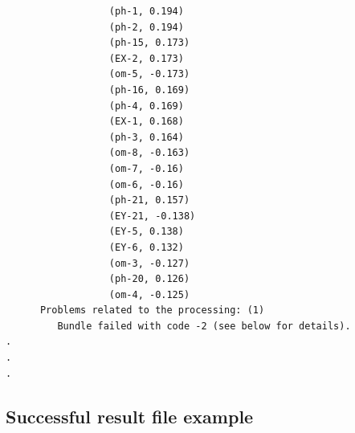 \documentclass{article}
\begin{document}
\begin{verbatim}
                  (ph-1, 0.194)
                  (ph-2, 0.194)
                  (ph-15, 0.173)
                  (EX-2, 0.173)
                  (om-5, -0.173)
                  (ph-16, 0.169)
                  (ph-4, 0.169)
                  (EX-1, 0.168)
                  (ph-3, 0.164)
                  (om-8, -0.163)
                  (om-7, -0.16)
                  (om-6, -0.16)
                  (ph-21, 0.157)
                  (EY-21, -0.138)
                  (EY-5, 0.138)
                  (EY-6, 0.132)
                  (om-3, -0.127)
                  (ph-20, 0.126)
                  (om-4, -0.125)
      Problems related to the processing: (1)
         Bundle failed with code -2 (see below for details).
.
.
.
\end{verbatim}

\newpage
\subsection{Successful result file example}
\label{sec:resultFile}
\end{document}
